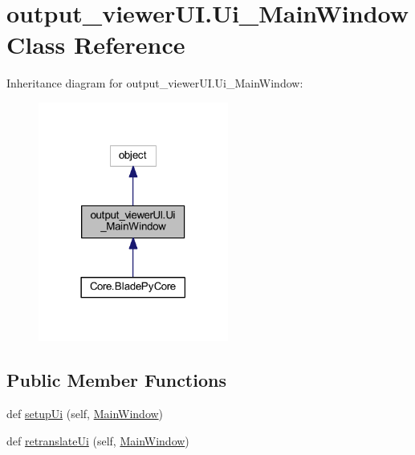\hypertarget{classoutput__viewer_u_i_1_1_ui___main_window}{}\section{output\+\_\+viewer\+U\+I.\+Ui\+\_\+\+Main\+Window Class Reference}
\label{classoutput__viewer_u_i_1_1_ui___main_window}


Inheritance diagram for output\+\_\+viewer\+U\+I.\+Ui\+\_\+\+Main\+Window\+:\nopagebreak
\begin{figure}[H]
\begin{center}
\leavevmode
\includegraphics[width=177pt]{classoutput__viewer_u_i_1_1_ui___main_window__inherit__graph}
\end{center}
\end{figure}
\subsection*{Public Member Functions}
\begin{DoxyCompactItemize}
\item 
def \hyperlink{classoutput__viewer_u_i_1_1_ui___main_window_a2a9ce5c092ffe5a4e4cabb341be7ceb4}{setup\+Ui} (self, \hyperlink{namespaceoutput__viewer_u_i_a95763e93bffcc3d9bda7ae977c5c2c4e}{Main\+Window})
\item 
def \hyperlink{classoutput__viewer_u_i_1_1_ui___main_window_a96efd9219a406e801e268b7add32cb78}{retranslate\+Ui} (self, \hyperlink{namespaceoutput__viewer_u_i_a95763e93bffcc3d9bda7ae977c5c2c4e}{Main\+Window})
\end{DoxyCompactItemize}
